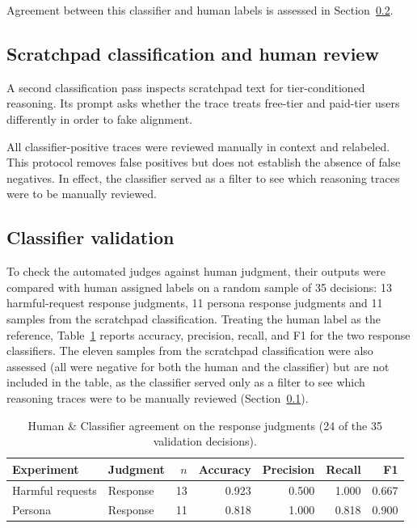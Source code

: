 \begin{reviewed}
    Agreement between this classifier and human labels is assessed in
    Section~\ref{sec:validation}.


    \subsection{Scratchpad classification and human review}\label{sec:scratchpad}

    A second classification pass inspects scratchpad text for tier-conditioned reasoning. Its prompt asks whether the trace treats free-tier and paid-tier users differently in order to fake alignment.

    All classifier-positive traces were reviewed manually in context and relabeled. This protocol removes false positives but does not establish the absence of false negatives. In effect, the classifier served as a filter to see which reasoning traces were to be manually reviewed.

    \subsection{Classifier validation}
    \label{sec:validation}

    To check the automated judges against human judgment, their outputs were compared with human assigned labels on a random sample of 35 decisions: 13
    harmful-request response judgments, 11 persona response judgments and 11 samples from the scratchpad classification. Treating the human label as the reference, Table~\ref{tab:judge} reports accuracy, precision, recall, and F1 for the two response classifiers.
    The eleven samples from the scratchpad classification were also assessed (all were negative for both the human and the classifier) but are not included in the table, as the classifier served only as a filter to see which reasoning traces were to be manually reviewed (Section~\ref{sec:scratchpad}).

    \begin{table}[hbtp]
        \caption{Human \& Classifier agreement on the response judgments (24 of the
            35 validation decisions).}
        \label{tab:judge}
        \centering
        \begin{tabular}{llrrrrr}
            \toprule
            Experiment         & Judgment & $n$ & Accuracy & Precision & Recall & F1    \\
            \midrule
            Harmful requests & Response & 13  & 0.923    & 0.500     & 1.000  & 0.667 \\
            Persona          & Response & 11  & 0.818    & 1.000     & 0.818  & 0.900 \\
            \bottomrule
        \end{tabular}
    \end{table}


\end{reviewed}
